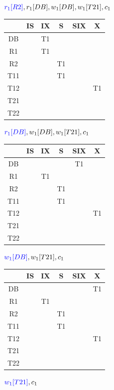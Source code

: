 \begin{note}
\begin{enumerate}[a)]
	$\textcolor{blue}{r_1[R2]}, r_1[DB], w_1[DB], w_1[T21], c_1$

\begin{tabular}{|c|c|c|c|c|c|}
	\hline
	& IS & IX & S & SIX & X \\
	\hline
	DB &  & T1 &  &  &  \\
	\hline
	R1 &  & T1 &  &  &  \\
	\hline
	R2 &  &  & T1 &  &  \\
	\hline
	T11 &  &  & T1 &  &  \\
	\hline
	T12 &  &  &  &  & T1 \\
	\hline
	T21 &  &  &  &  &  \\
	\hline
	T22 &  &  &  &  &  \\
	\hline
\end{tabular}

	$\textcolor{blue}{r_1[DB]}, w_1[DB], w_1[T21], c_1$

\begin{tabular}{|c|c|c|c|c|c|}
	\hline
	& IS & IX & S & SIX & X \\
	\hline
	DB &  &  &  & T1 &  \\
	\hline
	R1 &  & T1 &  &  &  \\
	\hline
	R2 &  &  & T1 &  &  \\
	\hline
	T11 &  &  & T1 &  &  \\
	\hline
	T12 &  &  &  &  & T1 \\
	\hline
	T21 &  &  &  &  &  \\
	\hline
	T22 &  &  &  &  &  \\
	\hline
\end{tabular}

	$\textcolor{blue}{w_1[DB]}, w_1[T21], c_1$

\begin{tabular}{|c|c|c|c|c|c|}
	\hline
	& IS & IX & S & SIX & X \\
	\hline
	DB &  &  &  &  & T1 \\
	\hline
	R1 &  & T1 &  &  &  \\
	\hline
	R2 &  &  & T1 &  &  \\
	\hline
	T11 &  &  & T1 &  &  \\
	\hline
	T12 &  &  &  &  & T1 \\
	\hline
	T21 &  &  &  &  &  \\
	\hline
	T22 &  &  &  &  &  \\
	\hline
\end{tabular}

	$\textcolor{blue}{w_1[T21]}, c_1$


\end{enumerate}
\end{note}
